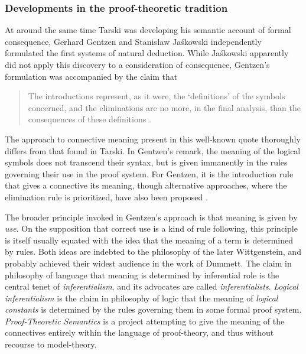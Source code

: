 	\subsubsection{Developments in the proof-theoretic tradition}
	At around the same time Tarski was developing his semantic account of formal consequence, Gerhard Gentzen and Stanis\l{}aw Ja\'{s}kowski independently formulated the first systems of natural deduction. While Ja\'{s}kowski apparently did not apply this discovery to a consideration of consequence, Gentzen's formulation was accompanied by the claim that
	\begin{quote}
		The introductions represent, as it were, the `definitions' of the symbols concerned, and the eliminations are no more, in the final analysis, than the consequences of these definitions \cite[80]{Gentzen1934Eng}.
	\end{quote}
	
	The approach to connective meaning present in this well-known quote thoroughly differs from that found in Tarski. In Gentzen's remark, the meaning of the logical symbols does not transcend their syntax, but is given immanently in the rules governing their use in the proof system. For Gentzen, it is the introduction rule that gives a connective its meaning, though alternative approaches, where the elimination rule is prioritized, have also been proposed \cite[186]{Schroeder-Heister2014}. 
	
	The broader principle invoked in Gentzen's approach is that meaning is given by \textit{use}. On the supposition that correct use is a kind of rule following, this principle is itself usually equated with the idea that the meaning of a term is determined by rules. Both ideas are indebted to the philosophy of the later Wittgenstein, and probably achieved their widest audience in the work of Dummett. The claim in philosophy of language that meaning is determined by inferential role is the central tenet of \textit{inferentialism}, and its advocates are called \textit{inferentialists}. \textit{Logical inferentialism} is the claim in philosophy of logic that the meaning of \textit{logical constants} is determined by the rules governing them in some formal proof system. \textit{Proof-Theoretic Semantics} is a project attempting to give the meaning of the connectives entirely within the language of proof-theory, and thus without recourse to model-theory.
	
